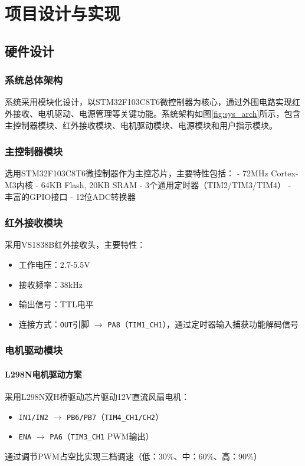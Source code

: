 
\section{项目设计与实现}

\subsection{硬件设计}

\subsubsection{系统总体架构}
系统采用模块化设计，以STM32F103C8T6微控制器为核心，通过外围电路实现红外接收、电机驱动、电源管理等关键功能。系统架构如图\ref{fig:sys_arch}所示，包含主控制器模块、红外接收模块、电机驱动模块、电源模块和用户指示模块。

\subsubsection{主控制器模块}
选用STM32F103C8T6微控制器作为主控芯片，主要特性包括：
- 72MHz Cortex-M3内核
- 64KB Flash, 20KB SRAM
- 3个通用定时器（TIM2/TIM3/TIM4）
- 丰富的GPIO接口
- 12位ADC转换器

\subsubsection{红外接收模块}
采用VS1838B红外接收头，主要特性：
\begin{itemize}
    \item 工作电压：2.7-5.5V
    \item 接收频率：38kHz
    \item 输出信号：TTL电平
    \item 连接方式：\texttt{OUT}引脚 $\rightarrow$ \texttt{PA8}（\texttt{TIM1\_CH1}），通过定时器输入捕获功能解码信号
\end{itemize}

\subsubsection{电机驱动模块}
\paragraph{L298N电机驱动方案}
采用L298N双H桥驱动芯片驱动12V直流风扇电机：
\begin{itemize}
    \item \texttt{IN1/IN2} $\rightarrow$ \texttt{PB6/PB7}（\texttt{TIM4\_CH1/CH2}）
    \item \texttt{ENA} $\rightarrow$ \texttt{PA6}（\texttt{TIM3\_CH1} PWM输出）
\end{itemize}
通过调节PWM占空比实现三档调速（低：30\%、中：60\%、高：90\%）

